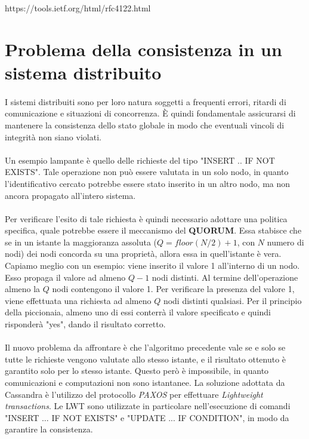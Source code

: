 \documentclass[11pt,a4paper,english]{article}
\begin{document}
https://tools.ietf.org/html/rfc4122.html


\section{Problema della consistenza in un sistema distribuito}

\paragraph{} I sistemi distribuiti sono per loro natura soggetti a frequenti errori, ritardi di comunicazione e situazioni di concorrenza. È quindi fondamentale assicurarsi di mantenere la consistenza dello stato globale in modo che eventuali vincoli di integrità non siano violati. 

\paragraph{} Un esempio lampante è quello delle richieste del tipo "INSERT .. IF NOT EXISTS". Tale operazione non può essere valutata in un solo nodo, in quanto l'identificativo cercato potrebbe essere stato inserito in un altro nodo, ma non ancora propagato all'intero sistema. 

\paragraph{} Per verificare l'esito di tale richiesta è quindi necessario adottare una politica specifica, quale potrebbe essere il meccanismo del \textbf{QUORUM}. Essa stabisce che se in un istante la maggioranza assoluta ($Q=floor(N/2) + 1$, con $N$ numero di nodi) dei nodi concorda su una proprietà, allora essa in quell'istante è vera. Capiamo meglio con un esempio: viene inserito il valore 1 all'interno di un nodo. Esso propaga il valore ad almeno $Q-1$ nodi distinti. Al termine dell'operazione almeno la $Q$ nodi contengono il valore 1. Per verificare la presenza del valore 1, viene effettuata una richiesta ad almeno $Q$ nodi distinti qualsiasi. Per il principio della piccionaia, almeno uno di essi conterrà il valore specificato e quindi risponderà "yes", dando il risultato corretto. 

\paragraph{} Il nuovo problema da affrontare è che l'algoritmo precedente vale se e solo se tutte le richieste vengono valutate allo stesso istante, e il risultato ottenuto è garantito solo per lo stesso istante. Questo però è impossibile, in quanto comunicazioni e computazioni non sono istantanee. La soluzione adottata da Cassandra è l'utilizzo del protocollo \emph{PAXOS} per effettuare \emph{Lightweight transactions}. Le LWT sono utilizzate in particolare nell'esecuzione di comandi "INSERT $\dots$ IF NOT EXISTS" e "UPDATE ... IF CONDITION", in modo da garantire la consistenza. 
\end{document}
